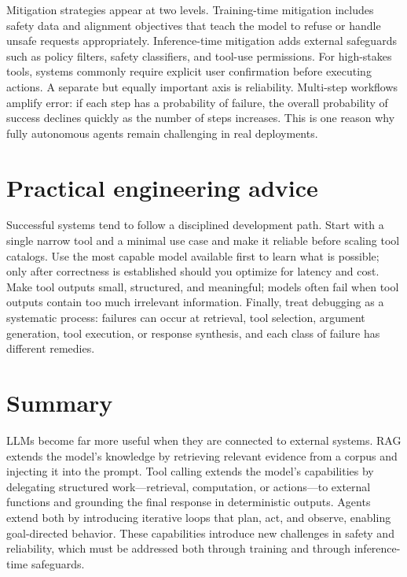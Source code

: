 Mitigation strategies appear at two levels. Training-time mitigation includes safety data and alignment objectives that teach the model to refuse or handle unsafe requests appropriately. Inference-time mitigation adds external safeguards such as policy filters, safety classifiers, and tool-use permissions. For high-stakes tools, systems commonly require explicit user confirmation before executing actions. A separate but equally important axis is reliability. Multi-step workflows amplify error: if each step has a probability of failure, the overall probability of success declines quickly as the number of steps increases. This is one reason why fully autonomous agents remain challenging in real deployments.

\section{Practical engineering advice}
Successful systems tend to follow a disciplined development path. Start with a single narrow tool and a minimal use case and make it reliable before scaling tool catalogs. Use the most capable model available first to learn what is possible; only after correctness is established should you optimize for latency and cost. Make tool outputs small, structured, and meaningful; models often fail when tool outputs contain too much irrelevant information. Finally, treat debugging as a systematic process: failures can occur at retrieval, tool selection, argument generation, tool execution, or response synthesis, and each class of failure has different remedies.

\section{Summary}
LLMs become far more useful when they are connected to external systems. RAG extends the model’s knowledge by retrieving relevant evidence from a corpus and injecting it into the prompt. Tool calling extends the model’s capabilities by delegating structured work—retrieval, computation, or actions—to external functions and grounding the final response in deterministic outputs. Agents extend both by introducing iterative loops that plan, act, and observe, enabling goal-directed behavior. These capabilities introduce new challenges in safety and reliability, which must be addressed both through training and through inference-time safeguards.

